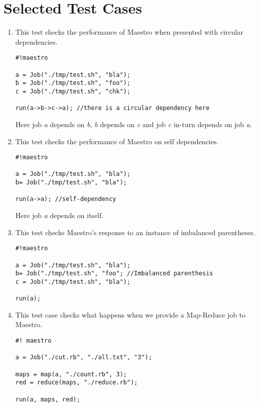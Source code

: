 \section{Selected Test Cases}
\begin{enumerate}

\item This test checks the performance of Maestro when presented with circular dependencies. 
\begin{verbatim}
#!maestro

a = Job("./tmp/test.sh", "bla");
b = Job("./tmp/test.sh", "foo");
c = Job("./tmp/test.sh", "chk");

run(a->b->c->a); //there is a circular dependency here
\end{verbatim}
Here job \textit{a} depends on \textit{b}, \textit{b} depends on \textit{c} and job \textit{c} in-turn depends on job \textit{a}.

\item This test checks the performance of Maestro on self dependencies.

\begin{verbatim}
#!maestro

a = Job("./tmp/test.sh", "bla");
b= Job("./tmp/test.sh", "bla");

run(a->a); //self-dependency
\end{verbatim}

Here job \textit{a} depends on itself.
\newpage
\noindent \item This test checks Maestro's response to an instance of imbalanced parentheses.

\begin{verbatim}
#!maestro

a = Job("./tmp/test.sh", "bla");
b= Job("./tmp/test.sh", "foo"; //Imbalanced parenthesis
c = Job("./tmp/test.sh", "bla");

run(a);
\end{verbatim}

\item This test case checks what happens when we provide a Map-Reduce job to Maestro.

\begin{verbatim}
#! maestro

a = Job("./cut.rb", "./all.txt", "3");

maps = map(a, "./count.rb", 3);
red = reduce(maps, "./reduce.rb");

run(a, maps, red);
\end{verbatim}

\end{enumerate}

